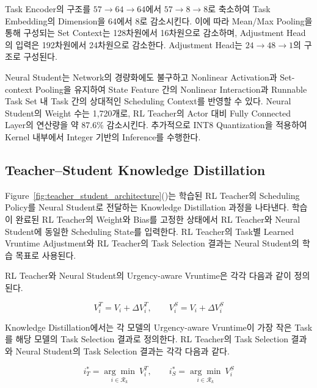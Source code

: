 Task Encoder의 구조를
$57 \rightarrow 64 \rightarrow 64$에서
$57 \rightarrow 8 \rightarrow 8$로 축소하여
Task Embedding의 Dimension을 64에서 8로 감소시킨다.
이에 따라 Mean/Max Pooling을 통해 구성되는
Set Context는 128차원에서 16차원으로 감소하며,
Adjustment Head의 입력은 192차원에서 24차원으로 감소한다.
Adjustment Head는 $24 \rightarrow 48 \rightarrow 1$의
구조로 구성된다.

Neural Student는 Network의 경량화에도 불구하고
Nonlinear Activation과 Set-context Pooling을 유지하여
State Feature 간의 Nonlinear Interaction과
Runnable Task Set 내 Task 간의 상대적인 Scheduling Context를
반영할 수 있다.
Neural Student의 Weight 수는 1,720개로,
RL Teacher의 Actor 대비 Fully Connected Layer의
연산량을 약 87.6\% 감소시킨다.
추가적으로 INT8 Quantization을 적용하여
Kernel 내부에서 Integer 기반의 Inference를 수행한다.

\subsection{Teacher--Student Knowledge Distillation}
\label{sec:design-teacher-student-knowledge-distillation}
Figure~\ref{fig:teacher_student_architecture}()는
학습된 RL Teacher의 Scheduling Policy를 Neural Student로 전달하는
Knowledge Distillation 과정을 나타낸다.
학습이 완료된 RL Teacher의 Weight와 Bias를
고정한 상태에서 RL Teacher와 Neural Student에 동일한
Scheduling State를 입력한다.
RL Teacher의 Task별 Learned Vruntime Adjustment와
RL Teacher의 Task Selection 결과는 Neural Student의
학습 목표로 사용된다.

RL Teacher와 Neural Student의 Urgency-aware Vruntime은
각각 다음과 같이 정의된다.

\begin{equation}
    V_i^T = V_i + \Delta V_i^T,\qquad V_i^S = V_i + \Delta V_i^S
\end{equation}

Knowledge Distillation에서는 각 모델의 Urgency-aware Vruntime이 가장 작은
Task를 해당 모델의 Task Selection 결과로 정의한다.
RL Teacher의 Task Selection 결과와 Neural Student의 Task Selection 결과는
각각 다음과 같다.

\begin{equation}
    i_T^* =
    \underset{i\in\mathcal{R}_k}{\arg\min}\ V_i^T,\qquad
    i_S^* =
    \underset{i\in\mathcal{R}_k}{\arg\min}\ V_i^S
\end{equation}

